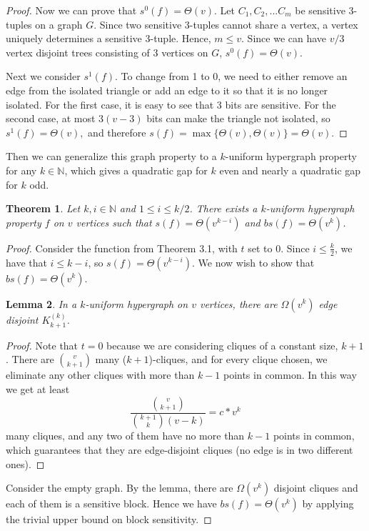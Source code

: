 \documentclass[psamsfonts]{amsart}
\newtheorem{theorem}{Theorem}[section]
\newtheorem{lem}[theorem]{Lemma}
\theoremstyle{definition}
\theoremstyle{remark}
\numberwithin{equation}{section}
\begin{document}
\begin{proof}
	Now we can prove that $s^0(f) = \Theta(v)$. Let $C_1, C_2, ... C_m$ be sensitive 3-tuples on a graph $G$. Since two sensitive 3-tuples cannot share a vertex, a vertex uniquely determines a sensitive 3-tuple. Hence, $m \leq v$. Since we can have $v/3$ vertex disjoint trees consisting of 3 vertices on $G$, $s^0(f) = \Theta(v)$.

	Next we consider $s^1(f)$. To change from 1 to 0, we need to either remove an edge from the isolated triangle or add an edge to it so that it is no longer isolated. For the first case, it is easy to see that 3 bits are sensitive. For the second case, at most $3(v-3)$ bits can make the triangle not isolated, so $s^1(f) = \Theta(v),$ and therefore $s(f) = \max\{\Theta(v),\Theta(v)\}=\Theta(v)$.
	\end{proof}


	Then we can generalize this graph property to a $k$-uniform hypergraph property for any $k \in \mathbb{N}$, which gives a quadratic gap for $k$ even and nearly a quadratic gap for $k$ odd.
	\begin{theorem}
		Let $k,i \in \mathbb{N}$ and $1 \leq i \leq k/2$.  There exists a $k$-uniform hypergraph property $f$ on $v$ vertices such that $s(f) = \Theta(v^{k-i})$ and $bs(f) = \Theta(v^{k})$.
	\end{theorem}
	\begin{proof}
		Consider the function from Theorem 3.1, with $t$ set to 0. Since $i\leq\frac{k}{2}$, we have that $i\leq k-i$, so $s(f)=\Theta(v^{k-i})$. We now wish to show that $bs(f)=\Theta(v^k)$.
		\begin{lem}
			In a $k$-uniform hypergraph on $v$ vertices, there are $\Omega (v^k)$ edge disjoint $K_{k+1}^{(k)}$.
		\end{lem}
		\begin{proof}
			Note that $t=0$ because we are considering cliques of a constant size, $k+1$.  There are $v \choose{k+1}$  many ($k+1$)-cliques, and for every clique chosen, we eliminate any other cliques with more than $k-1$ points in common. In this way we get at least
		\begin{equation}
			\frac{{v \choose{k+1}}}{{k+1 \choose{k}}(v-k)} = c*v^{k} \nonumber
		\end{equation}		 
		many cliques, and any two of them have no more than $k-1$ points in common, which guarantees that they are edge-disjoint cliques (no edge is in two different ones).
		\end{proof}
		Consider the empty graph. By the lemma, there are $\Omega (v^k)$ disjoint cliques and each of them is a sensitive block. Hence we have $bs(f) = \Theta (v^k)$ by applying the trivial upper bound on block sensitivity.
	\end{proof}
	
\end{document}
